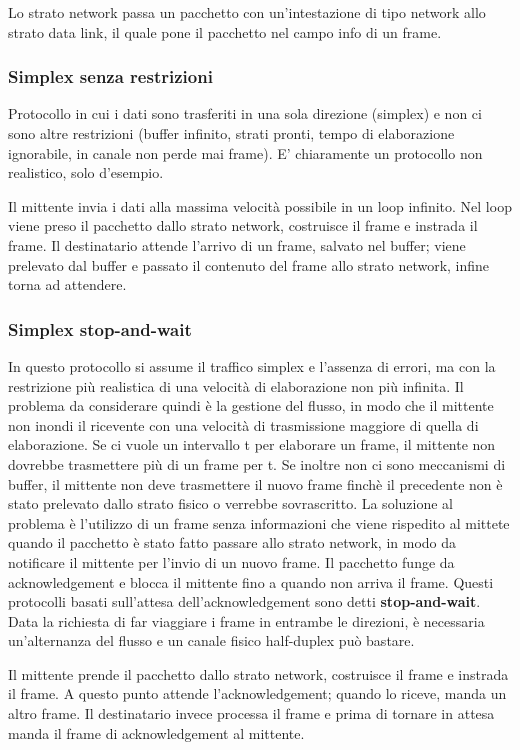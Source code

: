 Lo strato network passa un pacchetto con un'intestazione di tipo network allo strato data link, il quale pone il pacchetto nel campo info di un frame.

\subsubsection{Simplex senza restrizioni}
Protocollo in cui i dati sono trasferiti in una sola direzione (simplex) e non ci sono altre restrizioni
(buffer infinito, strati pronti, tempo di elaborazione ignorabile, in canale non perde mai frame).
E' chiaramente un protocollo non realistico, solo d'esempio.

Il mittente invia i dati alla massima velocità possibile in un loop infinito.
Nel loop viene preso il pacchetto dallo strato network, costruisce il frame e instrada il frame. 
Il destinatario attende l'arrivo di un frame, salvato nel buffer;
viene prelevato dal buffer e passato il contenuto del frame allo strato network, infine torna ad attendere.

\subsubsection{Simplex stop-and-wait}
In questo protocollo si assume il traffico simplex e l'assenza di errori, ma con la restrizione più realistica di una velocità di elaborazione non più infinita.
Il problema da considerare quindi è la gestione del flusso, in modo che il mittente non inondi il ricevente con una velocità di trasmissione maggiore di quella di elaborazione.
Se ci vuole un intervallo t per elaborare un frame, il mittente non dovrebbe trasmettere più di un frame per t.
Se inoltre non ci sono meccanismi di buffer, il mittente non deve trasmettere il nuovo frame finchè il precedente non è stato prelevato dallo strato fisico o verrebbe sovrascritto.
La soluzione al problema è l'utilizzo di un frame senza informazioni che viene rispedito al mittete quando il pacchetto è stato fatto passare allo strato network,
in modo da notificare il mittente per l'invio di un nuovo frame.
Il pacchetto funge da acknowledgement e blocca il mittente fino a quando non arriva il frame.
Questi protocolli basati sull'attesa dell'acknowledgement sono detti \textbf{stop-and-wait}.
Data la richiesta di far viaggiare i frame in entrambe le direzioni, è necessaria un'alternanza del flusso e un canale fisico half-duplex può bastare.

Il mittente prende il pacchetto dallo strato network, costruisce il frame e instrada il frame. 
A questo punto attende l'acknowledgement; quando lo riceve, manda un altro frame.
Il destinatario invece processa il frame e prima di tornare in attesa manda il frame di acknowledgement al mittente.

